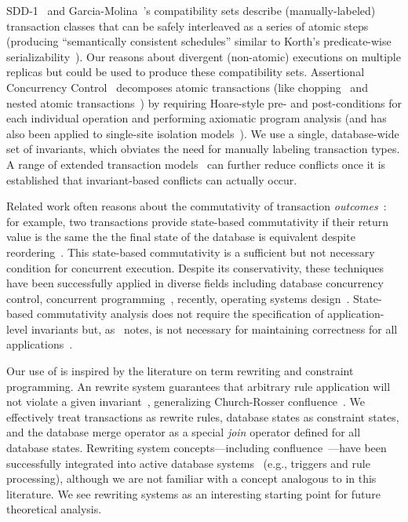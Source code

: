 SDD-1~\cite{sdd1} and Garcia-Molina~\cite{garciamolina-semantics}'s
compatibility sets describe (manually-labeled) transaction classes
that can be safely interleaved as a series of atomic steps (producing
``semantically consistent schedules'' similar to Korth's
predicate-wise serializability~\cite{korth-serializability}). Our
\iconfluence reasons about divergent (non-atomic) executions on
multiple replicas but could be used to produce these compatibility
sets. Assertional Concurrency Control~\cite{decomp-semantics}
decomposes atomic transactions (like chopping~\cite{chopping} and
nested atomic transactions~\cite{atomictransactions}) by requiring
Hoare-style pre- and post-conditions for each individual operation and
performing axiomatic program analysis (and has also been applied to
single-site isolation models~\cite{isolation-semantics}). We use a
single, database-wide set of invariants, which obviates the need for
manually labeling transaction types. A range of extended transaction
models~\cite{acta} can further reduce conflicts once it is established
that invariant-based conflicts can actually occur.

 Related work often reasons about
the commutativity of transaction \textit{outcomes}~\cite{boosting}:
for example, two transactions provide state-based commutativity if
their return value is the same the the final state of the database is
equivalent despite reordering~\cite{weihl-data,weihl-thesis}. This
state-based commutativity is a sufficient but not necessary condition
for concurrent execution. Despite its conservativity, these techniques
have been successfully applied in diverse fields including database
concurrency control, concurrent programming~\cite{boosting}, recently,
operating systems design~\cite{kohler-commutativity}. State-based
commutativity analysis does not require the specification of
application-level invariants but, as~\cite{kohler-commutativity}
notes, is not necessary for maintaining correctness for all
applications~\cite{lamport-audit}.

 Our use of \iconfluence is inspired by the
literature on term rewriting and constraint programming. An
\iconfluent rewrite system guarantees that arbitrary rule application
will not violate a given invariant~\cite{obs-confluence}, generalizing
Church-Rosser confluence~\cite{termrewriting}. We effectively treat
transactions as rewrite rules, database states as constraint states,
and the database merge operator as a special \textit{join} operator
defined for all database states.  Rewriting system
concepts---including confluence~\cite{aiken-confluence}---have been
successfully integrated into active database
systems~\cite{activedb-book} (e.g., triggers and rule processing),
although we are not familiar with a concept analogous to \iconfluence
in this literature. We see rewriting systems as an interesting
starting point for future theoretical analysis.


